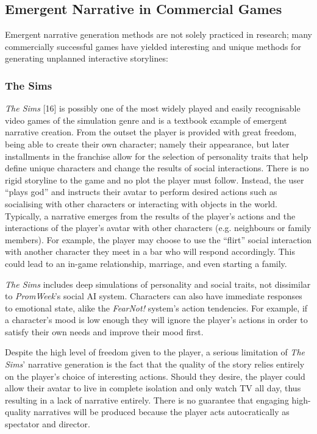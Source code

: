 \documentclass{sig-alternate-05-2015}
\begin{document}
\subsection{Emergent Narrative in Commercial Games}
Emergent narrative generation methods are not solely practiced in research; many commercially successful games have yielded interesting and unique methods for generating unplanned interactive storylines:

\subsubsection{The Sims}
\textit{The Sims} [16] is possibly one of the most widely played and easily recognisable video games of the simulation genre and is a textbook example of emergent narrative creation. 
From the outset the player is provided with great freedom, being able to create their own character; namely their appearance, but later installments in the franchise allow for the selection of personality traits that help define unique characters and change the results of social interactions. There is no rigid storyline to the game and no plot the player must follow. Instead, the user ``plays god'' and instructs their avatar to perform desired actions such as socialising with other characters or interacting with objects in the world. Typically, a narrative emerges from the results of the player's actions and the interactions of the player's avatar with other characters (e.g. neighbours or family members). For example, the player may choose to use the ``flirt'' social interaction with another character they meet in a bar who will respond accordingly. This could lead to an in-game relationship, marriage, and even starting a family.

\textit{The Sims} includes deep simulations of personality and social traits, not dissimilar to \textit{PromWeek}'s social AI system. Characters can also have immediate responses to emotional state, alike the \textit{FearNot!} system's action tendencies. For example, if a character's mood is low enough they will ignore the player's actions in order to satisfy their own needs and improve their mood first.

Despite the high level of freedom given to the player, a serious limitation of \textit{The Sims}' narrative generation is the fact that the quality of the story relies entirely on the player's choice of interesting actions. Should they desire, the player could allow their avatar to live in complete isolation and only watch TV all day, thus resulting in a lack of narrative entirely. There is no guarantee that engaging high-quality narratives will be produced because the player acts autocratically as spectator and director.
\end{document}
